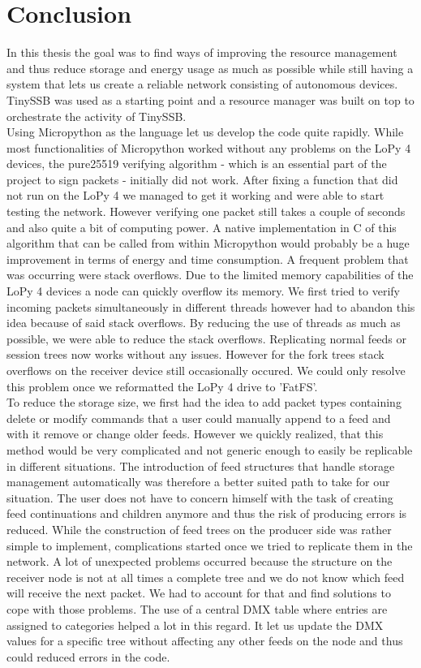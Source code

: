 \chapter{Conclusion}
In this thesis the goal was to find ways of improving the resource management and thus reduce storage and energy usage as much as possible while still having a system that lets us create a reliable network consisting of autonomous devices. TinySSB was used as a starting point and a resource manager was built on top to orchestrate the activity of TinySSB. \\
Using Micropython as the language let us develop the code quite rapidly. While most functionalities of Micropython worked without any problems on the LoPy 4 devices, the pure25519 verifying algorithm - which is an essential part of the project to sign packets - initially did not work. After fixing a function that did not run on the LoPy 4 we managed to get it working and were able to start testing the network. However verifying one packet still takes a couple of seconds and also quite a bit of computing power. A native implementation in C of this algorithm that can be called from within Micropython would probably be a huge improvement in terms of energy and time consumption. A frequent problem that was occurring were stack overflows. Due to the limited memory capabilities of the LoPy 4 devices a node can quickly overflow its memory. We first tried to verify incoming packets simultaneously in different threads however had to abandon this idea because of said stack overflows. By reducing the use of threads as much as possible, we were able to reduce the stack overflows. Replicating normal feeds or session trees now works without any issues. However for the fork trees stack overflows on the receiver device still occasionally occured. We could only resolve this problem once we reformatted the LoPy 4 drive to 'FatFS'. \\
To reduce the storage size, we first had the idea to add packet types containing delete or modify commands that a user could manually append to a feed and with it remove or change older feeds. However we quickly realized, that this method would be very complicated and not generic enough to easily be replicable in different situations. The introduction of feed structures that handle storage management automatically was therefore a better suited path to take for our situation. The user does not have to concern himself with the task of creating feed continuations and children anymore and thus the risk of producing errors is reduced. While the construction of feed trees on the producer side was rather simple to implement, complications started once we tried to replicate them in the network. A lot of unexpected problems occurred because the structure on the receiver node is not at all times a complete tree and we do not know which feed will receive the next packet. We had to account for that and find solutions to cope with those problems. The use of a central DMX table where entries are assigned to categories helped a lot in this regard. It let us update the DMX values for a specific tree without affecting any other feeds on the node and thus could reduced errors in the code. \\
